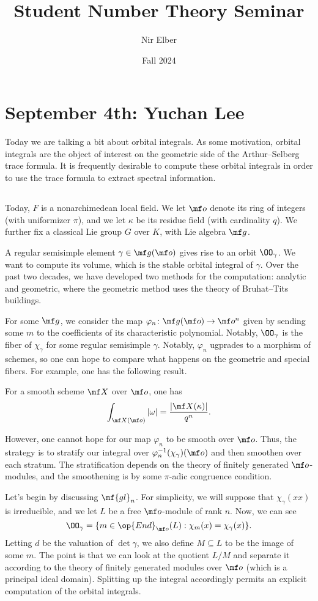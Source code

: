 \documentclass{article}
\title{Student Number Theory Seminar}
\author{Nir Elber}
\date{Fall 2024}
\begin{document}
\maketitle

\tableofcontents

\section{September 4th: Yuchan Lee}
Today we are talking a bit about orbital integrals. As some motivation, orbital integrals are the object of interest on the geometric side of the Arthur--Selberg trace formula. It is frequently desirable to compute these orbital integrals in order to use the trace formula to extract spectral information.

\subsection{}
Today, $F$ is a nonarchimedean local field. We let $\mf o$ denote its ring of integers (with uniformizer $\pi$), and we let $\kappa$ be its residue field (with cardinality $q$). We further fix a classical Lie group $G$ over $K$, with Lie algebra $\mf g$.

A regular semisimple element $\gamma\in\mf g(\mf o)$ gives rise to an orbit $\OO_\gamma$. We want to compute its volume, which is the stable orbital integral of $\gamma$. Over the past two decades, we have developed two methods for the computation: analytic and geometric, where the geometric method uses the theory of Bruhat--Tits buildings.

For some $\mf g$, we consider the map $\varphi_n\colon\mf g(\mf o)\to\mf o^n$ given by sending some $m$ to the coefficients of its characteristic polynomial. Notably, $\OO_\gamma$ is the fiber of $\chi_\gamma$ for some regular semisimple $\gamma$. Notably, $\varphi_n$ ugprades to a morphism of schemes, so one can hope to compare what happens on the geometric and special fibers. For example, one has the following result.
\begin{theorem}[Weil]
	For a smooth scheme $\mf X$ over $\mf o$, one has
	\[\int_{\mf X(\mf o)}\left|\omega\right|=\frac{\left|\mf X(\kappa)\right|}{q^n}.\]
\end{theorem}
However, one cannot hope for our map $\varphi_n$ to be smooth over $\mf o$. Thus, the strategy is to stratify our integral over $\varphi_n^{-1}(\chi_\gamma)(\mf o)$ and then smoothen over each stratum. The stratification depends on the theory of finitely generated $\mf o$-modules, and the smoothening is by some $\pi$-adic congruence condition.

Let's begin by discussing $\mf{gl}_n$. For simplicity, we will suppose that $\chi_\gamma(xx)$ is irreducible, and we let $L$ be a free $\mf o$-module of rank $n$. Now, we can see
\[\OO_\gamma=\{m\in\op{End}_{\mf o}(L):\chi_m(x)=\chi_\gamma(x)\}.\]
Letting $d$ be the valuation of $\det\gamma$, we also define $M\subseteq L$ to be the image of some $m$. The point is that we can look at the quotient $L/M$ and separate it according to the theory of finitely generated modules over $\mf o$ (which is a principal ideal domain). Splitting up the integral accordingly permits an explicit computation of the orbital integrals.
\end{document}
